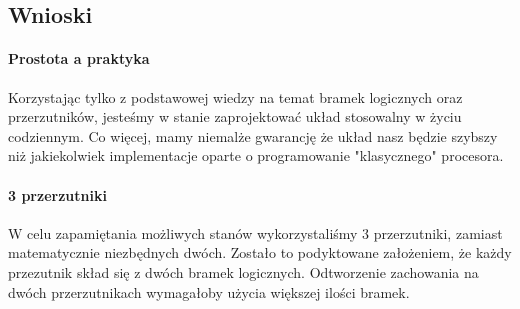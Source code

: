 \documentclass{article}
\begin{document}
\subsection{Wnioski}
\paragraph{Prostota a praktyka}
Korzystając tylko z podstawowej wiedzy na temat bramek logicznych oraz przerzutników, jesteśmy w stanie zaprojektować układ stosowalny w życiu codziennym. Co więcej, mamy niemalże gwarancję że układ nasz będzie szybszy niż jakiekolwiek implementacje oparte o programowanie "klasycznego" procesora.
\paragraph{3 przerzutniki}
W celu zapamiętania możliwych stanów wykorzystaliśmy 3 przerzutniki, zamiast matematycznie niezbędnych dwóch.
Zostało to podyktowane założeniem, że każdy przezutnik skład się z dwóch bramek logicznych. Odtworzenie zachowania na dwóch przerzutnikach wymagałoby użycia większej ilości bramek.
\end{document}
